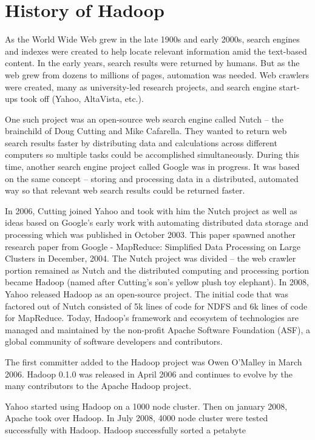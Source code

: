 \documentclass[conference]{IEEEtran}
\begin{document}
\section{History of Hadoop}
As the World Wide Web grew in the late 1900s and early 2000s, search engines and indexes were created to help locate relevant information amid the text-based content. In the early years, search results were returned by humans. But as the web grew from dozens to millions of pages, automation was needed. Web crawlers were created, many as university-led research projects, and search engine start-ups took off (Yahoo, AltaVista, etc.).
\par One such project was an open-source web search engine called Nutch – the brainchild of Doug Cutting and Mike Cafarella. They wanted to return web search results faster by distributing data and calculations across different computers so multiple tasks could be accomplished simultaneously. During this time, another search engine project called Google was in progress. It was based on the same concept – storing and processing data in a distributed, automated way so that relevant web search results could be returned faster.
\par In 2006, Cutting joined Yahoo and took with him the Nutch project as well as ideas based on Google’s early work with automating distributed data storage and processing which was published in October 2003. This paper spawned another research paper from Google - MapReduce: Simplified Data Processing on Large Clusters in December, 2004. The Nutch project was divided – the web crawler portion remained as Nutch and the distributed computing and processing portion became Hadoop (named after Cutting’s son’s yellow plush toy elephant). In 2008, Yahoo released Hadoop as an open-source project. The initial code that was factored out of Nutch consisted of 5k lines of code for NDFS and 6k lines of code for MapReduce. Today, Hadoop’s framework and ecosystem of technologies are managed and maintained by the non-profit Apache Software Foundation (ASF), a global community of software developers and contributors.
\par The first committer added to the Hadoop project was Owen O’Malley in March 2006. Hadoop 0.1.0 was released in April 2006 and continues to evolve by the many contributors to the Apache Hadoop project.
\par Yahoo started using Hadoop on a 1000 node cluster. Then on january 2008, Apache took over Hadoop. In July 2008, 4000 node cluster were tested successfully with Hadoop. Hadoop successfully sorted a petabyte
\end{document}
